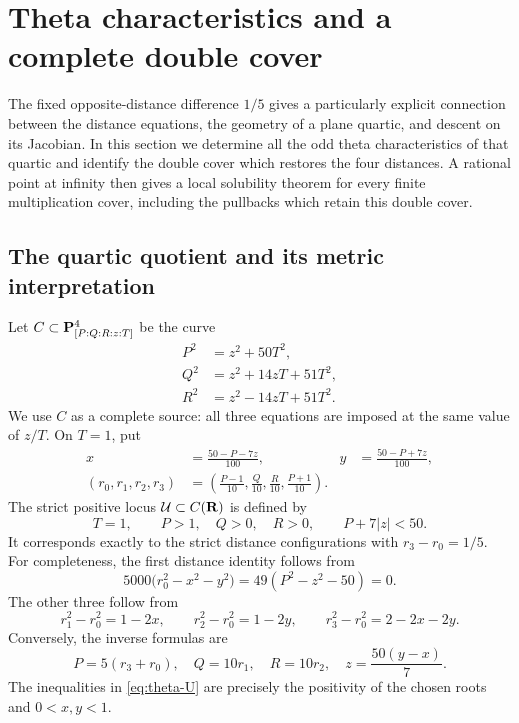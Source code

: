\section{Theta characteristics and a complete double cover}
\label{sec:theta}

The fixed opposite-distance difference $1/5$ gives a particularly explicit
connection between the distance equations, the geometry of a plane quartic,
and descent on its Jacobian.  In this section we determine all the odd theta
characteristics of that quartic and identify the double cover which restores
the four distances.  A rational point at infinity then gives a local
solubility theorem for every finite multiplication cover, including the
pullbacks which retain this double cover.

\subsection{The quartic quotient and its metric interpretation}

Let $C\subset\mathbf P^4_{[P:Q:R:z:T]}$ be the curve
\begin{equation}
 \begin{split}
 P^2&=z^2+50T^2,\\
 Q^2&=z^2+14zT+51T^2,\\
 R^2&=z^2-14zT+51T^2.
 \end{split}
 \label{eq:theta-C}
\end{equation}
We use $C$ as a complete source: all three equations are imposed at the same
value of $z/T$.  On $T=1$, put
\begin{equation}
 \begin{aligned}
 x&=\frac{50-P-7z}{100},&
 y&=\frac{50-P+7z}{100},\\
 (r_0,r_1,r_2,r_3)&=
 \left(\frac{P-1}{10},\frac Q{10},\frac R{10},\frac{P+1}{10}\right).
 \end{aligned}
 \label{eq:theta-return}
\end{equation}
The strict positive locus $\mathcal U\subset C(\mathbf R)$ is defined by
\begin{equation}
 T=1,\qquad P>1,\quad Q>0,\quad R>0,\qquad P+7|z|<50.
 \label{eq:theta-U}
\end{equation}
It corresponds exactly to the strict distance configurations with
$r_3-r_0=1/5$.  For completeness, the first distance identity follows from
\[
 5000\bigl(r_0^2-x^2-y^2\bigr)
   =49(P^2-z^2-50)=0.
\]
The other three follow from
\[
 r_1^2-r_0^2=1-2x,\qquad
 r_2^2-r_0^2=1-2y,\qquad
 r_3^2-r_0^2=2-2x-2y.
\]
Conversely, the inverse formulas are
\[
 P=5(r_3+r_0),\quad Q=10r_1,\quad R=10r_2,
 \quad z=\frac{50(y-x)}7.
\]
The inequalities in \eqref{eq:theta-U} are precisely the positivity of the
chosen roots and $0<x,y<1$.

